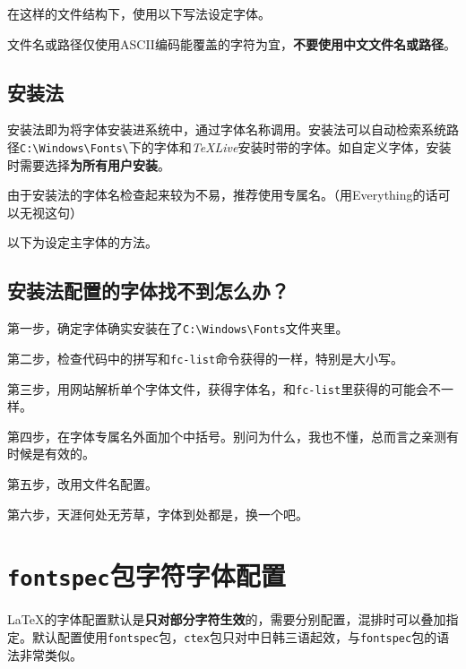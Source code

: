 \documentclass[10pt,openany]{book}
\begin{document}
在这样的文件结构下，使用以下写法设定字体。



文件名或路径仅使用ASCII编码能覆盖的字符为宜，\textbf{不要使用中文文件名或路径}。

\subsection{安装法}

安装法即为将字体安装进系统中，通过字体名称调用。安装法可以自动检索系统路径\texttt{C:\textbackslash{}Windows\textbackslash{}Fonts\textbackslash{}}下的字体和\textit{TeXLive}安装时带的字体。如自定义字体，安装时需要选择\textbf{为所有用户安装}。

由于安装法的字体名检查起来较为不易，推荐使用专属名。（用Everything的话可以无视这句）

以下为设定主字体的方法。



\subsection{安装法配置的字体找不到怎么办？}

第一步，确定字体确实安装在了\texttt{C:\textbackslash{}Windows\textbackslash{}Fonts}文件夹里。

第二步，检查代码中的拼写和\texttt{fc-list}命令获得的一样，特别是大小写。

第三步，用网站解析单个字体文件，获得字体名，和\texttt{fc-list}里获得的可能会不一样。

第四步，在字体专属名外面加个中括号。别问为什么，我也不懂，总而言之亲测有时候是有效的。



第五步，改用文件名配置。

第六步，天涯何处无芳草，字体到处都是，换一个吧。

\section{\texorpdfstring{\texttt{fontspec}包字符字体配置}{fontspec包字符字体配置}}

 {\LaTeX}的字体配置默认是\textbf{只对部分字符生效}的，需要分别配置，混排时可以叠加指定。默认配置使用\texttt{fontspec}包，\texttt{ctex}包只对中日韩三语起效，与\texttt{fontspec}包的语法非常类似。
\end{document}
